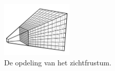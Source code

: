 \begin{figure}[tb]
  \centering
  \includegraphics[width=0.3\textwidth]{./img/raw/cs-opdeling-frustum.png}
  \caption{De opdeling van het zichtfrustum.}
  \label{fig:cs-opdeling-frustum}
\end{figure}
